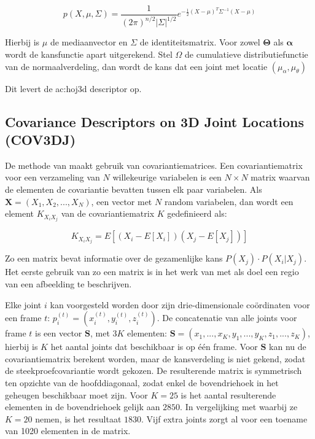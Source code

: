 $$p(X, \mu, \Sigma) = \frac{1}{(2\pi)^{n/2}|\Sigma|^{1/2}}e^{-\frac{1}{2}(X - \mu)^T\Sigma^{-1}(X - \mu)}$$

Hierbij is $\mu$ de mediaanvector en $\Sigma$ de identiteitsmatrix. Voor zowel $\mathbf{\Theta}$ als $\mathbf{\alpha}$ wordt de kansfunctie apart uitgerekend. Stel $\Omega$ de cumulatieve distributiefunctie van de normaalverdeling, dan wordt de kans dat een joint met locatie $(\mu_\alpha, \mu_\theta)$ 


Dit levert de \gls{ac:hoj3d} descriptor op. 



\subsection{Covariance Descriptors on 3D Joint Locations (COV3DJ)}
De methode van \cite{Hussein2013} maakt gebruik van covariantiematrices. Een covariantiematrix voor een verzameling van $N$ willekeurige variabelen is een $N \times N$ matrix waarvan de elementen de covariantie bevatten tussen elk paar variabelen. Als $\textbf{X} = (X_1, X_2, ..., X_N)$, een vector met $N$ random variabelen, dan wordt een element $K_{X_{i}X_{j}}$ van de covariantiematrix $K$ gedefinieerd als:

$$K_{X_{i}X_{j}} = E[(X_i - E[X_i])(X_j - E[X_j])]$$

Zo een matrix bevat informatie over de gezamenlijke kans $P(X_j) \cdot P(X_i | X_j)$. Het eerste gebruik van zo een matrix is in het werk van \cite{Tuzel2006} met als doel een regio van een afbeelding te beschrijven.

Elke joint $i$ kan voorgesteld worden door zijn drie-dimensionale coördinaten voor een frame $t$: $p_i^{(t)} = (x_i^{(t)}, y_i^{(t)}, z_i^{(t)})$. De concatenatie van alle joints voor frame $t$ is een vector $\textbf{S}$, met $3K$ elementen: $\textbf{S} = (x_1, ..., x_K,y_1, ..., y_K,z_1, ..., z_K)$, hierbij is $K$ het aantal joints dat beschikbaar is op één frame. Voor $\textbf{S}$ kan nu de covariantiematrix berekent worden, maar de kansverdeling is niet gekend, zodat de steekproefcovariantie wordt gekozen. De resulterende matrix is symmetrisch ten opzichte van de hoofddiagonaal, zodat enkel de bovendriehoek in het geheugen beschikbaar moet zijn. Voor $K = 25$ is het aantal resulterende elementen in de bovendriehoek gelijk aan $2850$. In vergelijking met \cite{Hussein2013} waarbij ze $K = 20$ nemen, is het resultaat $1830$. Vijf extra joints zorgt al voor een toename van 1020 elementen in de matrix.

